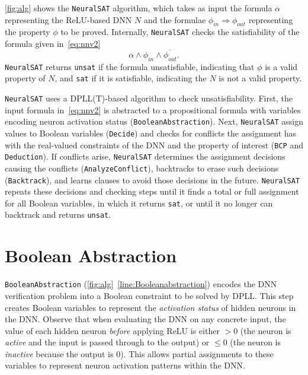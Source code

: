 \documentclass[oneside,11pt,dvipsnames]{book}
\numberwithin{equation}{section}
\theoremstyle{definition}
\theoremstyle{remark}
\newcommand{\tool}{\texttt{NeuralSAT}}
\begin{document}
\autoref{fig:alg} shows the \tool{} algorithm, which takes as input the formula $\alpha$ representing the ReLU-based DNN $N$ and the formulae $\phi_{in}\Rightarrow \phi_{out}$ representing the property $\phi$ to be proved.
Internally, \tool{} checks the satisfiability of the formula given in~\autoref{eq:nnv2}
\begin{equation*}
  \alpha \land \phi_{in} \land \overline{\phi_{out}}.
\end{equation*}
\tool{} returns \texttt{unsat} if the formula unsatisfiable, indicating  that $\phi$ is a valid property of $N$, and \texttt{sat} if it is satisfiable, indicating the $N$ is not a valid property.

\tool{} uses a  DPLL(T)-based algorithm to check unsatisfiability.
First, the input formula in~\autoref{eq:nnv2} is abstracted to a propositional formula
with variables encoding neuron activation status (\texttt{BooleanAbstraction}).
Next, \tool{} assign values to Boolean variables (\texttt{Decide}) and checks for conflicts the assignment has with the real-valued constraints of the DNN and the property of interest (\texttt{BCP} and \texttt{Deduction}).
If conflicts arise, \tool{} determines the assignment decisions causing the conflicts (\texttt{AnalyzeConflict}), backtracks to erase such decisions (\texttt{Backtrack}), and learns clauses to avoid those decisions in the future.
\tool{} repeats these decisions and checking steps until it finds a total or full assignment for all Boolean variables, in which it returns \texttt{sat}, or until it no longer can backtrack and returns \texttt{unsat}.




\section{Boolean Abstraction}
\texttt{BooleanAbstraction} (\autoref{fig:alg}~\autoref{line:Booleanabstraction}) encodes the DNN verification problem into a Boolean constraint to be solved by DPLL.  This step creates Boolean variables to represent the \emph{activation status} of hidden neurons in the DNN. Observe that when evaluating the DNN on any concrete input, the value of each hidden neuron \emph{before} applying ReLU is either $>0$ (the neuron is \emph{active} and the input is passed through to the output) or $\le 0$ (the neuron is \emph{inactive} because the output is 0).
This allows partial assignments to these variables to represent neuron activation patterns within the DNN.
\end{document}
